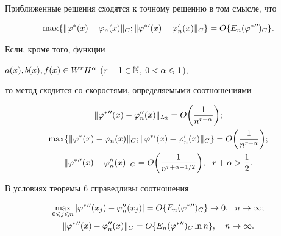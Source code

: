 \begin{cornonum}


Приближенные решения сходятся к точному решению в том смысле, что


$$


\max\{ \|\vp^*(x)-\vp_n(x)\|_C;\|\vp^*{}'(x)-\vp_n'(x)\|_C\}=


O\{E_n(\vp^*{}'')_C\}.


$$


Если, кроме того, функции


$a(x),b(x),f(x)\in W^rH^\alpha$ ($r+1\in \Bbb{N}$, $0<\alpha\leqslant 1$),


то метод сходится со скоростями, определяемыми соотношениями


\begin{gather*}


\|\vp^*{}''(x)-\vp_n''(x)\|_{L_2}=O\bigg(\frac{1}{n^{r+\al}}\bigg);\\


%


\max\{ \|\vp^*(x)-\vp_n(x)\|_C;\|\vp^*{}'(x)-\vp_n'(x)\|_C\}=


O\bigg(\frac{1}{n^{r+\al}}\bigg); \\


%


\|\vp^*{}''(x)-\vp_n''(x)\|_C=O\bigg(\frac{1}{n^{r+\al-1/2}}\bigg),


\ \ r+\al >\frac{1}{2}.


\end{gather*}


\end{cornonum}








\begin{thm}


В условиях теоремы $6$ справедливы соотношения


\begin{gather*}


\max_{0\lea j\lea n}|\vp^*{}''(x_j)-\vp_n''(x_j)|=


O\{E_n(\vp^*{}'')_C\}\to 0,\ \ n\to \infty; \\


%


\|\vp^*{}''(x)-\vp_n''(x)\|_C=O\{E_n(\vp^*{}'')_C \ln n\},\quad n\to \infty .


\end{gather*}


\end{thm}





